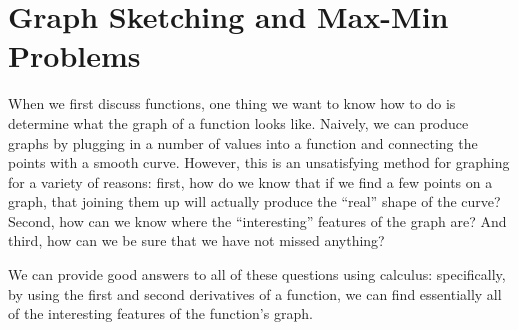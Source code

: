 \chapter{Graph Sketching and Max-Min Problems}
\label{ch:graph-sketching}
When we first discuss functions, one thing we want to know how to do is
determine what the graph of a function looks like.  Naively, we can produce
graphs by plugging in a number of values into a function and connecting the
points with a smooth curve. However, this is an unsatisfying method for graphing
for a variety of reasons: first, how do we know that if we find a few points on
a graph, that joining them up will actually produce the ``real'' shape of the
curve?  Second, how can we know where the ``interesting'' features of the graph
are? And third, how can we be sure that we have not missed anything?


We can provide good answers to all of these questions using calculus:
specifically, by using the first and second derivatives of a function, we can
find essentially all of the interesting features of the function's graph.





